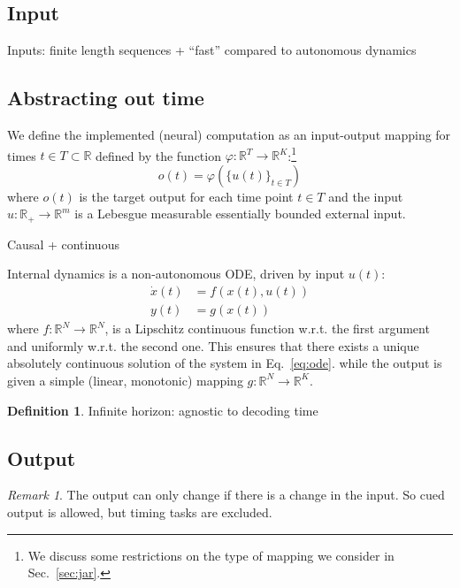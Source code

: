 \documentclass{scrartcl}
\theoremstyle{definition}
\newtheorem{definition}{Definition}
\theoremstyle{remark}
\newtheorem{remark}{Remark}
\newcommand{\reals}{\mathbb{R}}
\begin{document}
\subsection{Input}
Inputs: finite length sequences + ``fast'' compared to autonomous dynamics



\subsection{Abstracting out time}

We define the implemented (neural) computation as an input-output mapping for times $t\in T\subset\reals$ defined by the function $\varphi:\reals^T\rightarrow\reals^K$:\footnote{We discuss some restrictions on the type of mapping we consider in Sec.~\ref{sec:jar}.}
\begin{equation}
o(t) = \varphi(\{u(t)\}_{t\in T})
\end{equation}
where $o(t)$ is the target output for each time point $t\in T$ and the input  $u:\reals_{+}\to \reals^{m}$  is a Lebesgue measurable essentially bounded external input.

Causal + continuous \citep{lanthaler2023}

Internal dynamics is a non-autonomous ODE, driven by input $u(t)$:
\begin{align}
\dot x(t) &= f(x(t),u(t))\label{eq:ode}\\
y(t) &= g(x(t))	\label{eq:output}
\end{align}
where $f:\reals^N\rightarrow\reals^N$, is a Lipschitz continuous function w.r.t. the first argument and uniformly w.r.t. the second one. This ensures that there exists a unique absolutely continuous solution of the system in Eq.~\ref{eq:ode}.
while the output is given a simple (linear, monotonic) mapping $g:\reals^N\rightarrow\reals^K$.




\begin{definition}
Infinite horizon: agnostic to decoding time
\end{definition}






\subsection{Output}
\begin{remark}
The output can only change if there is a change in the input. 
So cued output is allowed, but timing tasks are excluded.
\end{remark}
\end{document}
